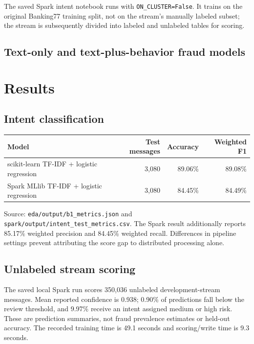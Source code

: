 \documentclass[
  english,
  11pt,
  letterpaper,
]{article}
\newcounter{none} %
\begin{document}
The saved Spark intent notebook runs with \texttt{ON\_CLUSTER=False}. It
trains on the original Banking77 training split, not on the stream's
manually labeled subset; the stream is subsequently divided into labeled
and unlabeled tables for scoring.

\subsection{Text-only and text-plus-behavior fraud
models}\label{text-only-and-text-plus-behavior-fraud-models}

\section{Results}\label{sec-results}

\subsection{Intent classification}\label{intent-classification}

{\def\LTcaptype{none} %
\begin{longtable}[]{@{}lrrr@{}}
\toprule\noalign{}
Model & Test messages & Accuracy & Weighted F1 \\
\midrule\noalign{}
\endhead
\bottomrule\noalign{}
\endlastfoot
scikit-learn TF-IDF + logistic regression & 3,080 & 89.06\% & 89.08\% \\
Spark MLlib TF-IDF + logistic regression & 3,080 & 84.45\% & 84.49\% \\
\end{longtable}
}

Source: \texttt{eda/output/b1\_metrics.json} and
\texttt{spark/output/intent\_test\_metrics.csv}. The Spark result
additionally reports 85.17\% weighted precision and 84.45\% weighted
recall. Differences in pipeline settings prevent attributing the score
gap to distributed processing alone.

\subsection{Unlabeled stream scoring}\label{unlabeled-stream-scoring}

The saved local Spark run scores 350,036 unlabeled development-stream
messages. Mean reported confidence is 0.938; 0.90\% of predictions fall
below the review threshold, and 9.97\% receive an intent assigned medium
or high risk. These are prediction summaries, not fraud prevalence
estimates or held-out accuracy. The recorded training time is 49.1
seconds and scoring/write time is 9.3 seconds.
\end{document}
